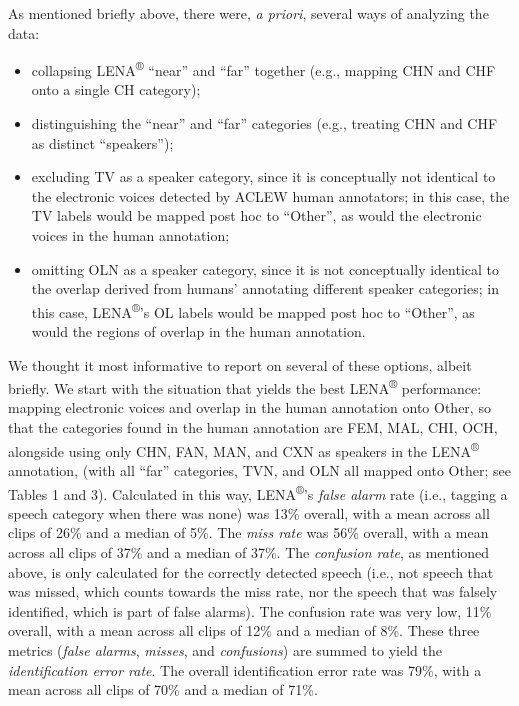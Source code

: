 \documentclass[english,table,man,floatsintext]{apa6}
\providecommand{\tightlist}{%
  \setlength{\itemsep}{0pt}\setlength{\parskip}{0pt}}
\begin{document}
As mentioned briefly above, there were, \emph{a priori}, several ways of
analyzing the data:

\begin{itemize}
\tightlist
\item
  collapsing LENA\textsuperscript{®} \enquote{near} and \enquote{far}
  together (e.g., mapping CHN and CHF onto a single CH category);
\item
  distinguishing the \enquote{near} and \enquote{far} categories (e.g.,
  treating CHN and CHF as distinct \enquote{speakers});
\item
  excluding TV as a speaker category, since it is conceptually not
  identical to the electronic voices detected by ACLEW human annotators;
  in this case, the TV labels would be mapped post hoc to
  \enquote{Other}, as would the electronic voices in the human
  annotation;
\item
  omitting OLN as a speaker category, since it is not conceptually
  identical to the overlap derived from humans' annotating different
  speaker categories; in this case, LENA\textsuperscript{®}'s OL labels
  would be mapped post hoc to \enquote{Other}, as would the regions of
  overlap in the human annotation.
\end{itemize}

We thought it most informative to report on several of these options,
albeit briefly. We start with the situation that yields the best
LENA\textsuperscript{®} performance: mapping electronic voices and
overlap in the human annotation onto Other, so that the categories found
in the human annotation are FEM, MAL, CHI, OCH, alongside using only
CHN, FAN, MAN, and CXN as speakers in the LENA\textsuperscript{®}
annotation, (with all \enquote{far} categories, TVN, and OLN all mapped
onto Other; see Tables 1 and 3). Calculated in this way,
LENA\textsuperscript{®}'s \emph{false alarm} rate (i.e., tagging a
speech category when there was none) was 13\% overall, with a mean
across all clips of 26\% and a median of 5\%. The \emph{miss rate} was
56\% overall, with a mean across all clips of 37\% and a median of 37\%.
The \emph{confusion rate}, as mentioned above, is only calculated for
the correctly detected speech (i.e., not speech that was missed, which
counts towards the miss rate, nor the speech that was falsely
identified, which is part of false alarms). The confusion rate was very
low, 11\% overall, with a mean across all clips of 12\% and a median of
8\%. These three metrics (\emph{false alarms}, \emph{misses}, and
\emph{confusions}) are summed to yield the \emph{identification error
rate}. The overall identification error rate was 79\%, with a mean
across all clips of 70\% and a median of 71\%.
\end{document}
